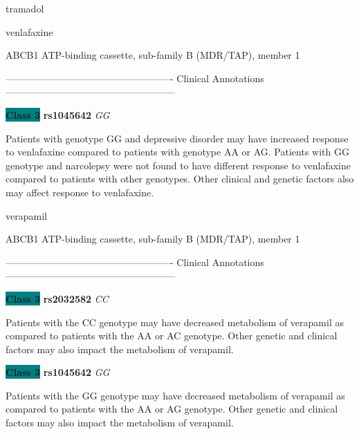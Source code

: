 \documentclass{resume} %
\begin{document}
\begin{rSection}{ tramadol }
\end{rSection}\begin{rSection}{ venlafaxine }
\item[]

\begin{rSubsection}{ ABCB1 }{ ATP-binding cassette, sub-family B (MDR/TAP), member 1 }{}{}
\item[]

\item[] ---------------------------------------------------- Clinical Annotations -----------------------------------------------------\newline
\item \textbf{\colorbox{teal} {Class 3}} \textbf{ rs1045642 } \textit{ GG }
\item[] Patients with genotype GG and depressive disorder may have increased response to venlafaxine compared to patients with genotype AA or AG. Patients with GG genotype and narcolepsy were not found to have different response to venlafaxine compared to patients with other genotypes. Other clinical and genetic factors also may affect response to venlafaxine.
\end{rSubsection}

\end{rSection}\begin{rSection}{ verapamil }
\item[]

\begin{rSubsection}{ ABCB1 }{ ATP-binding cassette, sub-family B (MDR/TAP), member 1 }{}{}
\item[]

\item[] ---------------------------------------------------- Clinical Annotations -----------------------------------------------------\newline
\item \textbf{\colorbox{teal} {Class 3}} \textbf{ rs2032582 } \textit{ CC }
\item[] Patients with the CC genotype may have decreased metabolism of verapamil as compared to patients with the AA or AC genotype. Other genetic and clinical factors may also impact the metabolism of verapamil.\item \textbf{\colorbox{teal} {Class 3}} \textbf{ rs1045642 } \textit{ GG }
\item[] Patients with the GG genotype may have decreased metabolism of verapamil as compared to patients with the AA or AG genotype. Other genetic and clinical factors may also impact the metabolism of verapamil.
\end{rSubsection}


\end{rSection}
\end{document}
